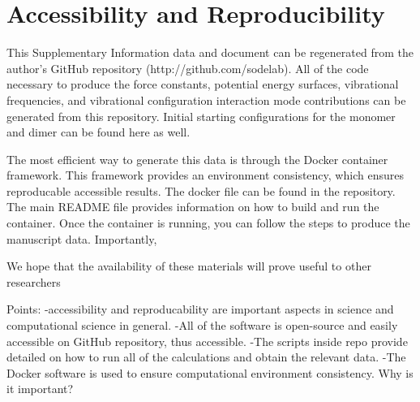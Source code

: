 \documentclass[aip,jcp,showpacs,superscriptaddress,groupedaddress]{revtex4-1}  %
\begin{document}
\section[S3]{\label{sec:reproduce}Accessibility and Reproducibility}
This Supplementary Information data and document can be regenerated from the author's GitHub repository (http://github.com/sodelab). All of the code necessary to produce the force constants, potential energy surfaces, vibrational frequencies, and vibrational configuration interaction mode contributions can be generated from this repository. Initial starting configurations for the monomer and dimer can be found here as well. 

The most efficient way to generate this data is through the Docker container framework. This framework provides an environment consistency, which ensures reproducable accessible results. The docker file can be found in the repository. The main README file provides information on how to build and run the container. Once the container is running, you can follow the steps to produce the manuscript data. Importantly, 

We hope that the availability of these materials will prove useful to other researchers

Points:
-accessibility and reproducability are important aspects in science and computational science in general.
-All of the software is open-source and easily accessible on GitHub repository, thus accessible.
-The scripts inside repo provide detailed on how to run all of the calculations and obtain the relevant data.
-The Docker software is used to ensure computational environment consistency. Why is it important?





%
\end{document}
